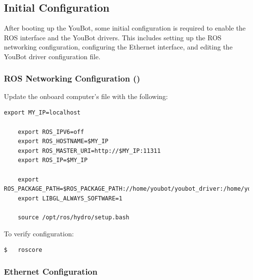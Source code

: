 \documentclass[a4paper, 12pt]{article}
\newcommand{\code}[1]{\texttt{\detokenize{#1}}}
\begin{document}
    \subsection{Initial Configuration}

    After booting up the YouBot, some initial configuration is required to enable the ROS interface and the YouBot drivers. This includes setting up the ROS networking configuration, configuring the Ethernet interface, and editing the YouBot driver configuration file. 

    \subsubsection{ROS Networking Configuration (\code{.bashrc})}
    Update the onboard computer's \code{.bashrc} file with the following: 

    \begin{lstlisting}[style=plain]
    export MY_IP=localhost

    export ROS_IPV6=off
    export ROS_HOSTNAME=$MY_IP
    export ROS_MASTER_URI=http://$MY_IP:11311
    export ROS_IP=$MY_IP

    export ROS_PACKAGE_PATH=$ROS_PACKAGE_PATH://home/youbot/youbot_driver:/home/youbot/ros_stacks:/home/youbot/applications
    export LIBGL_ALWAYS_SOFTWARE=1

    source /opt/ros/hydro/setup.bash
    \end{lstlisting}

    To verify configuration:
    \begin{lstlisting}[style=plain]
$   roscore 
    \end{lstlisting}



    \subsubsection{Ethernet Configuration}
\end{document}
